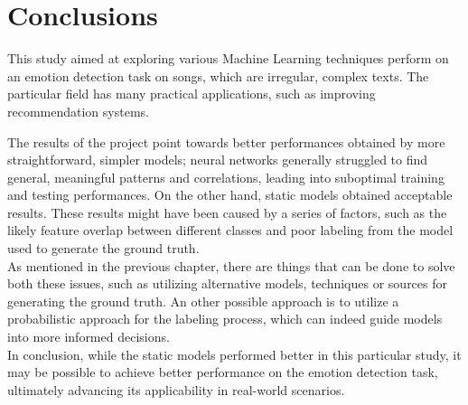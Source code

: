 \chapter*{Conclusions}
\label{ch:conclusions}
This study aimed at exploring various Machine Learning techniques perform on an
emotion detection task on songs, which are irregular, complex texts.
The particular field has many practical applications, such as improving
recommendation systems.

The results of the project point towards better performances obtained by more
straightforward, simpler models; neural networks generally struggled to find
general, meaningful patterns and correlations, leading into suboptimal
training and testing performances. On the other hand, static models obtained
acceptable results. These results might have been caused by a series of
factors, such as the likely feature overlap between different classes and
poor labeling from the model used to generate the ground truth.\\

As mentioned in the previous chapter, there are things that can be done to
solve both these issues, such as utilizing alternative models, techniques or
sources for generating the ground truth. An other possible approach
is to utilize a probabilistic approach for the labeling process, which
can indeed guide models into more informed decisions.\\

In conclusion, while the static models performed better in this particular study,
it may be possible to achieve better performance on the emotion
detection task, ultimately advancing its applicability in real-world scenarios.
